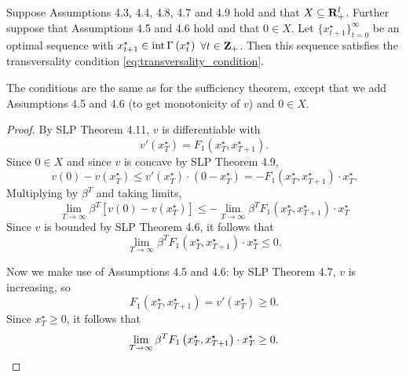 \documentclass[11pt,letterpaper,reqno,oneside]{article}
\begin{document}
\begin{proposition}
	Suppose Assumptions 4.3, 4.4, 4.8, 4.7 and 4.9 hold and that $X \subseteq \mathbf{R}_+^l$. Further suppose that Assumptions 4.5 and 4.6 hold and that $0 \in X$. Let $\{ x^\star_{t+1} \}_{t=0}^\infty$ be an optimal sequence with $x^\star_{t+1} \in \operatorname*{int}{ \Gamma \left( x^\star_t \right) }$ $\forall t \in \mathbf{Z}_+$. Then this sequence satisfies the transversality condition \eqref{eq:transversality_condition}.
\end{proposition}

The conditions are the same as for the sufficiency theorem, except that we add Assumptions 4.5 and 4.6 (to get monotonicity of $v$) and $0 \in X$.

\begin{proof}
	By SLP Theorem 4.11, $v$ is differentiable with
	\begin{equation*}
		v'\left( x^\star_T \right) = F_1\left( x^\star_T, x^\star_{T+1} \right) .
	\end{equation*}
	Since $0 \in X$ and since $v$ is concave by SLP Theorem 4.9,
	\begin{equation*}
		v( 0 ) - v\left( x^\star_T \right) 
		\leq v'\left( x^\star_T \right) 
		\cdot \left( 0 - x^\star_T \right)
		= - F_1\left( x^\star_T, x^\star_{T+1} \right)
		\cdot x^\star_T .
	\end{equation*}
	Multiplying by $\beta^T$ and taking limits,
	\begin{equation*}
		\lim_{T \to \infty} 
		\beta^T \left[ v( 0 ) - v\left( x^\star_T \right) \right]
		\leq - \lim_{T \to \infty} \beta^T 
		F_1\left( x^\star_T, x^\star_{T+1} \right) 
		\cdot x^\star_T
	\end{equation*}
	Since $v$ is bounded by SLP Theorem 4.6, it follows that
	\begin{equation*}
		\lim_{T \to \infty} 
		\beta^T F_1\left( x^\star_T, x^\star_{T+1} \right)
		\cdot x^\star_T
		\leq 0 .
	\end{equation*}
	
	Now we make use of Assumptions 4.5 and 4.6: by SLP Theorem 4.7, $v$ is increasing, so
	\begin{equation*}
		F_1\left( x^\star_T, x^\star_{T+1} \right)
		= v'\left( x^\star_T \right) \geq 0 .
	\end{equation*}
	Since $x^\star_T \geq 0$, it follows that
	\begin{equation*}
		\lim_{T \to \infty} \beta^T
		F_1\left( x^\star_T, x^\star_{T+1} \right)
		\cdot x^\star_T
		\geq 0 . \qedhere
	\end{equation*}
\end{proof}
\end{document}

